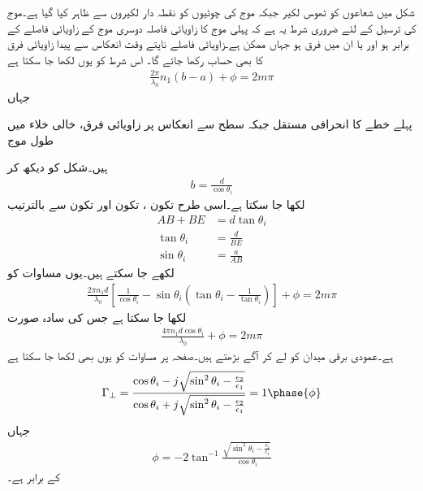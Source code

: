 شکل  میں شعاعوں کو ٹھوس لکیر جبکہ موج کی چوٹیوں کو نقطہ دار لکیروں سے ظاہر کیا گیا ہے۔موج کی ترسیل کے لئے ضروری شرط یہ ہے کہ پہلی موج کا زاویائی فاصلہ  دوسری موج کے زاویائی فاصلے  کے برابر ہو اور یا ان میں فرق  ہو جہاں  ممکن ہے۔زاویائی فاصلے ناپتے وقت انعکاس سے پیدا زاویائی فرق کا بھی حساب رکھا جائے گا۔ اس شرط کو یوں لکھا جا سکتا ہے
\begin{align}\label{مساوات_مویج_تختے_میں_ممکن_زاویے}
\frac{2\pi}{\lambda_0} n_1 (b-a)+\phi=2 m\pi
\end{align}
جہاں
\begin{description}
 پہلے خطے کا انحرافی مستقل  جبکہ
 سطح سے انعکاس پر  زاویائی فرق،
 خالی خلاء میں طول موج
\end{description}
ہیں۔شکل  کو دیکھ کر
\begin{align}
b=\frac{d}{\cos \theta_i}
\end{align}
لکھا جا سکتا ہے۔اسی طرح تکون ، تکون  اور تکون  سے بالترتیب  
\begin{align*}
AB+BE&=d\tan \theta_i\\
\tan \theta_i&=\frac{d}{BE}\\
\sin\theta_i &=\frac{a}{AB}
\end{align*}
لکھے جا سکتے ہیں۔یوں مساوات  کو
\begin{align}
\frac{2\pi n_1 d}{\lambda_0} \left[\frac{1}{\cos \theta_i}-\sin \theta_i \left(\tan \theta_i-\frac{1}{\tan \theta_i} \right) \right]+\phi=2 m \pi
\end{align}
لکھا جا سکتا ہے جس کی سادہ صورت
\begin{align}\label{مساوات_مویج_تختہ_ت}
\frac{4\pi n_1 d \cos \theta_i}{\lambda_0}+\phi=2 m \pi
\end{align}
ہے۔عمودی برقی میدان  کو لے کر آگے بڑھتے ہیں۔صفحہ  پر مساوات  کو یوں بھی لکھا جا سکتا ہے
\begin{align}\label{مساوات_مویج_تختہ_ٹ}
\Gamma_{\perp}=\frac{\cos \theta_i-j \sqrt{\sin^2 \theta_i-\frac{\epsilon_2}{\epsilon_1}}}{\cos \theta_i+j \sqrt{\sin^2 \theta_i-\frac{\epsilon_2}{\epsilon_1}}}=1\phase{\phi}
\end{align}
جہاں
\begin{align}
\phi=-2\tan^{-1} \frac{\sqrt{\sin^2 \theta_i -\frac{\epsilon_2}{\epsilon_1}} }{\cos \theta_i}
\end{align}
کے برابر ہے۔


